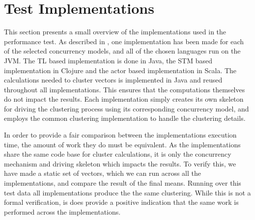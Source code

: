 %

\section{Test Implementations}
This section presents a small overview of the implementations used in the performance test. As described in , one implementation has been made for each of the selected concurrency models, and all of the chosen languages run on the \ac{JVM}. The \ac{TL} based implementation is done in Java, the \ac{STM} based implementation in Clojure and the actor based implementation in Scala. The calculations needed to cluster vectors is implemented in Java and reused throughout all implementations. This ensures that the computations themselves do not impact the results. Each implementation simply creates its own skeleton for driving the clustering process using its corresponding concurrency model, and employs the common clustering implementation to handle the clustering details. 

In order to provide a fair comparison between the implementations execution time, the amount of work they do must be equivalent. As the implementations share the same code base for cluster calculations, it is only the concurrency mechanism and driving skeleton which impacts the results. To verify this, we have made a static set of vectors, which we can run across all the implementations, and compare the result of the final means. Running over this test data all implementations produce the the same clustering. While this is not a formal verification, is does provide a positive indication that the same work is performed across the implementations.
%
